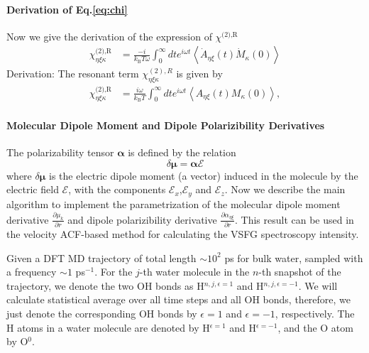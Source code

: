 \paragraph{Derivation of Eq.\space\ref{eq:chi}}

Now we give the derivation of the expression of $\chi^{\text{(2),R}}$
\begin{align}
   \chi^{\text{(2),R}}_{\eta\xi\kappa}&=\frac{-i}{k_{\text{B}}T \omega} \int_0^\infty dt e^{i \omega t}\left\langle \dot{A}_{\eta\xi}(t) \dot{M}_{\kappa}(0)\right\rangle
\end{align}
Derivation: 
The resonant term $\chi^{(2),R}_{\eta\xi\kappa}$ is given by \cite{Morita2008}
\begin{align}
  \chi^{\text{(2),R}}_{\eta\xi\kappa}&=\frac{i\omega}{k_{\text{B}}T} \int_0^\infty dt e^{i \omega t}\left\langle {A}_{\eta\xi}(t) {M}_{\kappa}(0)\right\rangle,
\end{align}

\paragraph{Molecular Dipole Moment and Dipole Polarizibility Derivatives} \label{calculate_derivatives} 

The polarizability tensor $\boldsymbol{\alpha}$ is defined by the relation
\begin{equation}
  \delta \boldsymbol{\mu} = \boldsymbol{\alpha} \boldsymbol{\mathscr{E}}
  \label{eq:def_alpha}
\end{equation}
where $\delta \boldsymbol{\mu}$ is the electric dipole moment (a vector) induced in the molecule by
the electric field $\boldsymbol{\mathscr{E}}$, with the components $\mathscr{E}_x$,$\mathscr{E}_y$ and $\mathscr{E}_z$.
Now we describe the main algorithm to implement the parametrization of the molecular dipole moment 
derivative $\frac{\partial \mu_k}{\partial r}$ and dipole polarizibility derivative $\frac{\partial\alpha_{\eta\xi}}{\partial r}$. 
This result can be used in the velocity ACF-based method for calculating the VSFG spectroscopy intensity.

Given a DFT MD trajectory of total length $\sim 10^2$ ps for bulk water, sampled with a frequency $\sim 1$ ps$^{-1}$.
For the $j$-th water molecule in the $n$-th snapshot of the trajectory, 
we denote the two OH bonds as H$^{n,j,\epsilon=1}$ and H$^{n,j,\epsilon=-1}$. We will calculate statistical average over all time steps and all OH bonds, therefore, 
we just denote the corresponding OH bonds by ${\epsilon=1}$ and ${\epsilon=-1}$, respectively. 
The H atoms in a water molecule are denoted by H$^{\epsilon=1}$ and H$^{\epsilon=-1}$, and the O atom by O$^{0}$.

